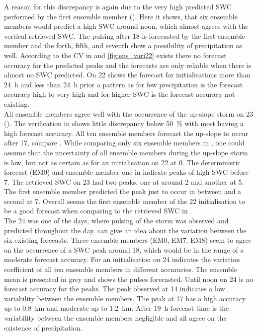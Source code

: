 A reason for this discrepancy is again due to the very high predicted SWC performed by the first ensemble member (). Here it shows, that six ensemble members would predict a high SWC around noon, which almost agrees with the vertical retrieved SWC. The pulsing after \SI{18}{\UTC} is forecasted by the first ensemble member and the forth, fifth, and seventh show a possibility of precipitation as well. 
According to the CV in  and \ref{fig:ens_vari22} exists there no forecast accuracy for the predicted peaks and the forecasts are only reliable when there is almost no SWC predicted. On \SI{22}{\dec} shows the forecast for initialisations more than \SI{24}{\hour} and less than \SI{24}{\hour} prior a pattern as for few precipitation is the forecast accuracy high to very high and for higher SWC is the forecast accuracy not existing. 
\\
All ensemble members agree well with the occurrence of the up-slope storm on \SI{23}{\dec} (). The verification in  shows little discrepancy below \SI{50}{\percent} with most having a high forecast accuracy. All ten ensemble members forecast the up-slope to occur after \SI{17}{\UTC}, compare . While comparing only six ensemble members in , one could assume that the uncertainty of all ensemble members during the up-slope storm is low, but not as certain as for an initialisation on \SI{22}{\dec} at \SI{0}{\UTC}. 
The deterministic forecast (EM0) and ensemble member one in  indicate peaks of high SWC before \SI{7}{\UTC}. The retrieved SWC on \SI{23}{\dec} had two peaks, one at around \SI{2}{\UTC} and another at \SI{5}{\UTC}. The first ensemble member predicted the peak just to occur in between and a second at \SI{7}{\UTC}. Overall seems the first ensemble member of the  \SI{22}{\dec} initialisation to be a good forecast when comparing to the retrieved SWC in .
\\
The \SI{24}{\dec} was one of the days, where pulsing of the storm was observed and predicted throughout the day. 
 can give an idea about the variation between the six existing forecasts. Three ensemble members (EM0, EM7, EM8) seem to agree on the occurrence of a SWC peak around \SI{18}{\UTC}, which would be in the range of a moderate forecast accuracy. 
For an initialisation on \SI{24}{\dec} indicates the variation coefficient of all ten ensemble members in  different accuracies. The ensemble mean is presented in grey and shows the pulses forecasted. Until noon on \SI{24}{\dec} is no forecast accuracy for the peaks. The peak observed at \SI{14}{\UTC} indicates a low variability between the ensemble members. The peak at \SI{17}{\UTC} has a high accuracy up to \SI{0.8}{\km} and moderate up to \SI{1.2}{\km}. After \SI{19}{\hour} forecast time is the variability between the ensemble members negligible and all agree on the existence of precipitation.
